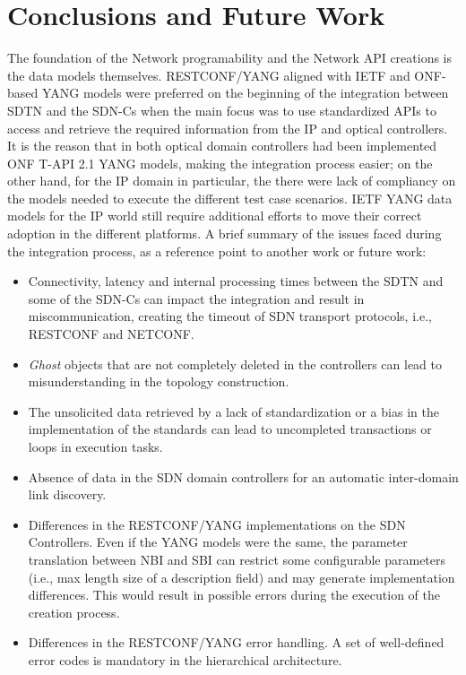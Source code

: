 \documentclass[a4paper,fleqn]{cas-dc}
\begin{document}
\section{Conclusions and Future Work}
\label{section:conclusions}
The foundation of the Network programability and the Network API creations is the data models themselves. RESTCONF/YANG aligned with IETF and ONF-based YANG models were preferred on the beginning of the integration between SDTN and the SDN-Cs when the main focus was to use standardized APIs to access and retrieve the required information from the IP and optical controllers. It is the reason that in both optical domain controllers had been implemented ONF T-API 2.1 YANG models, making the integration process easier; on the other hand, for the IP domain in particular, the there were lack of compliancy on the models  needed to execute the different test case scenarios. IETF YANG data models for the IP world still require additional efforts to move their correct adoption in the different platforms. 
A brief summary of the issues faced during the integration process, as a reference point to another work or future work: 

\begin{itemize}
    \item Connectivity, latency and internal processing times between the SDTN and some of the SDN-Cs can impact the integration and result in miscommunication, creating the timeout of SDN transport protocols, i.e., RESTCONF and NETCONF.  
    \item \textit{Ghost} objects that are not completely deleted in the controllers can lead to misunderstanding in the topology construction. 
    \item The unsolicited data retrieved by a lack of standardization or a bias in the implementation of the standards can lead to uncompleted transactions or loops in execution tasks.
    \item Absence of data in the SDN domain controllers for an automatic inter-domain link discovery.
    \item Differences in the RESTCONF/YANG implementations on the SDN Controllers. Even if the YANG models were the same, the parameter translation between NBI and SBI can restrict some configurable parameters (i.e., max length size of a description field) and may generate implementation differences. This would result in possible errors during the execution of the creation process.
    \item Differences in the RESTCONF/YANG error handling. A set of well-defined error codes is mandatory in the hierarchical architecture.
\end{itemize}
\end{document}
